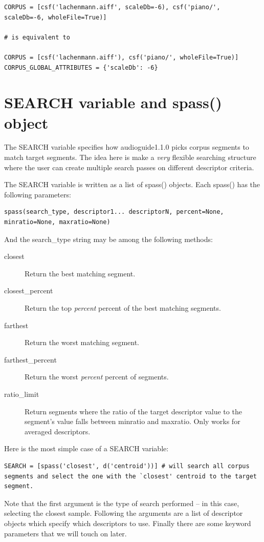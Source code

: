 \documentclass{article}
\newcommand{\ag}{audioguide1.1.0\xspace}
\begin{document}
\begin{spacing}{1.2}
\begin{lstlisting}
CORPUS = [csf('lachenmann.aiff', scaleDb=-6), csf('piano/', scaleDb=-6, wholeFile=True)]

# is equivalent to 

CORPUS = [csf('lachenmann.aiff'), csf('piano/', wholeFile=True)]
CORPUS_GLOBAL_ATTRIBUTES = {'scaleDb': -6}
\end{lstlisting}


\section{SEARCH variable and spass() object}
The SEARCH variable specifies how \ag picks corpus segments to match target segments.  The idea here is make a \emph{very} flexible searching structure where the user can create multiple search passes on different descriptor criteria.

The SEARCH variable is written as a list of spass() objects.  Each spass() has the following parameters: 
\begin{lstlisting}
spass(search_type, descriptor1... descriptorN, percent=None, minratio=None, maxratio=None)
\end{lstlisting}

And the search\_type string may be among the following methods:
\begin{description}
\item[closest] Return the best matching segment.
\item[closest\_percent] Return the top \emph{percent} percent of the best matching segments.
\item[farthest] Return the worst matching segment.
\item[farthest\_percent] Return the worst \emph{percent} percent of segments.
\item[ratio\_limit] Return segments where the ratio of the target descriptor value to the segment's value falls between minratio and maxratio.  Only works for averaged descriptors.
\end{description}


Here is the most simple case of a SEARCH variable:
\begin{lstlisting}
SEARCH = [spass('closest', d('centroid'))] # will search all corpus segments and select the one with the `closest' centroid to the target segment.
\end{lstlisting}

Note that the first argument is the type of search performed -- in this case, selecting the closest sample.  Following the arguments are a list of descriptor objects which specify which descriptors to use.  Finally there are some keyword parameters that we will touch on later.


\end{spacing}
\end{document}
